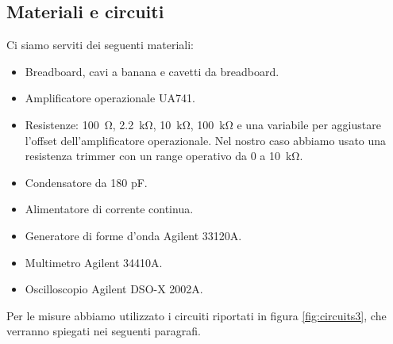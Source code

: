 \subsection{Materiali e circuiti}

Ci siamo serviti dei seguenti materiali:

\begin{itemize}
    \item{Breadboard, cavi a banana e cavetti da breadboard.}
    \item{Amplificatore operazionale UA741.}
    \item{Resistenze: \SI{100}{\ohm}, \SI{2.2}{\kilo\ohm}, \SI{10}{\kilo\ohm}, \SI{100}{\kilo\ohm}
        e una variabile per aggiustare l'offset dell'amplificatore operazionale.
        Nel nostro caso abbiamo usato una resistenza trimmer con un range operativo da 0
        a \SI{10}{\kilo\ohm}.}
    \item{Condensatore da 180 pF.}
    \item{Alimentatore di corrente continua.}
    \item{Generatore di forme d'onda Agilent 33120A.}
    \item{Multimetro Agilent 34410A.}
    \item{Oscilloscopio Agilent DSO-X 2002A.}
\end{itemize}

Per le misure abbiamo utilizzato i circuiti riportati in figura \ref{fig:circuits3},
che verranno spiegati nei seguenti paragrafi.

